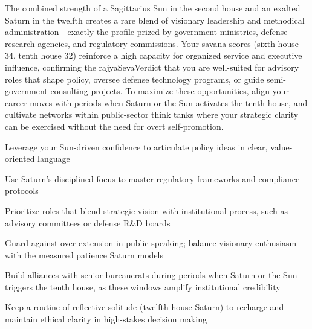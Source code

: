 {\fontsize{9}{13}\selectfont The combined strength of a Sagittarius Sun in the second house and an exalted Saturn in the twelfth creates a rare blend of visionary leadership and methodical administration---exactly the profile prized by government ministries, defense research agencies, and regulatory commissions. Your savana scores (sixth house 34, tenth house 32) reinforce a high capacity for organized service and executive influence, confirming the rajyaSevaVerdict that you are well-suited for advisory roles that shape policy, oversee defense technology programs, or guide semi-government consulting projects. To maximize these opportunities, align your career moves with periods when Saturn or the Sun activates the tenth house, and cultivate networks within public-sector think tanks where your strategic clarity can be exercised without the need for overt self-promotion.}\par\vspace{1.8mm}

\begin{diamondlist}
  \item {\fontsize{8.5}{12}\selectfont Leverage your Sun-driven confidence to articulate policy ideas in clear, value-oriented language}
  \item {\fontsize{8.5}{12}\selectfont Use Saturn's disciplined focus to master regulatory frameworks and compliance protocols}
  \item {\fontsize{8.5}{12}\selectfont Prioritize roles that blend strategic vision with institutional process, such as advisory committees or defense R\&D boards}
  \item {\fontsize{8.5}{12}\selectfont Guard against over-extension in public speaking; balance visionary enthusiasm with the measured patience Saturn models}
  \item {\fontsize{8.5}{12}\selectfont Build alliances with senior bureaucrats during periods when Saturn or the Sun triggers the tenth house, as these windows amplify institutional credibility}
  \item {\fontsize{8.5}{12}\selectfont Keep a routine of reflective solitude (twelfth-house Saturn) to recharge and maintain ethical clarity in high-stakes decision making}
\end{diamondlist}


\label{topic43}

